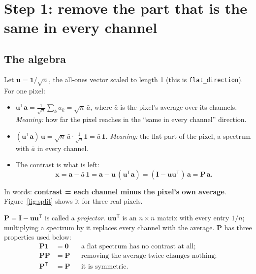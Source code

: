 \documentclass[11pt,letterpaper]{article}
\newcommand{\code}[1]{\texttt{#1}}
\newcommand{\va}{\mathbf{a}}
\newcommand{\vx}{\mathbf{x}}
\newcommand{\vone}{\mathbf{1}}
\newcommand{\vu}{\mathbf{u}}
\newcommand{\mP}{\mathbf{P}}
\newcommand{\mI}{\mathbf{I}}
\newcommand{\T}{^{\mathsf{T}}}
\newcommand{\src}[3]{%
  }
\begin{document}
\section{Step 1: remove the part that is the same in every channel}
\label{sec:contrast}

\src{259}{272}{\code{flat\_direction} and \code{contrast}.}

\subsection{The algebra}

Let $\vu = \vone/\sqrt n$, the all-ones vector scaled to length 1 (this is
\code{flat\_direction}).  For one pixel:
\begin{itemize}
\item $\vu\T\va = \frac{1}{\sqrt n}\sum_k a_k = \sqrt n\,\bar a$, where
  $\bar a$ is the pixel's average over its channels.  \emph{Meaning:} how far
  the pixel reaches in the ``same in every channel'' direction.
\item $(\vu\T\va)\,\vu = \sqrt n\,\bar a \cdot \frac{1}{\sqrt n}\vone =
  \bar a\,\vone$.  \emph{Meaning:} the flat part of the pixel, a spectrum with
  $\bar a$ in every channel.
\item The contrast is what is left:
  \begin{equation}
  \vx = \va - \bar a\,\vone = \va - \vu\,(\vu\T\va) = (\mI - \vu\vu\T)\,\va
  = \mP\,\va.
  \label{eq:contrast}
  \end{equation}
\end{itemize}
In words: \textbf{contrast = each channel minus the pixel's own average}.
Figure~\ref{fig:split} shows it for three real pixels.

$\mP = \mI - \vu\vu\T$ is called a \emph{projector}.  $\vu\vu\T$ is an
$n\times n$ matrix with every entry $1/n$; multiplying a spectrum by it
replaces every channel with the average.  $\mP$ has three properties used
below:
\begin{align}
\mP\vone &= \mathbf 0 && \text{a flat spectrum has no contrast at all;} \label{eq:P1}\\
\mP\mP &= \mP && \text{removing the average twice changes nothing;} \label{eq:PP}\\
\mP\T &= \mP && \text{it is symmetric.} \label{eq:PT}
\end{align}
\end{document}
